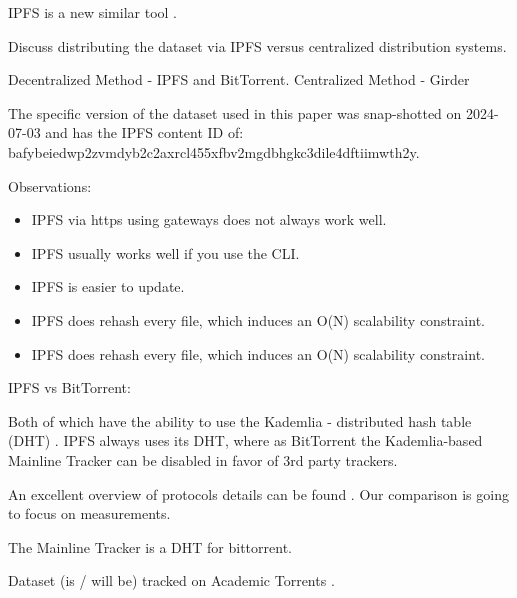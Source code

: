 \documentclass[10pt,twocolumn,letterpaper]{article}
\begin{document}
IPFS is a new similar tool \cite{benet_ipfs_2014,bieri_overview_2021}.


Discuss distributing the dataset via IPFS versus centralized distribution
systems.

Decentralized Method - IPFS and BitTorrent.
Centralized Method - Girder


The specific version of the dataset used in this paper was snap-shotted on
2024-07-03 and has the IPFS content ID of:
bafybeiedwp2zvmdyb2c2axrcl455xfbv2mgdbhgkc3dile4dftiimwth2y.

Observations:
\begin{itemize}
    \item IPFS via https using gateways does not always work well.
    \item IPFS usually works well if you use the CLI.
    \item IPFS is easier to update.
    \item IPFS does rehash every file, which induces an O(N) scalability constraint.
    \item IPFS does rehash every file, which induces an O(N) scalability constraint.
\end{itemize}


IPFS vs BitTorrent:

Both of which have the ability to use the Kademlia - distributed hash table (DHT) \cite{maymounkov_kademlia_2002}.
IPFS always uses its DHT, where as BitTorrent the Kademlia-based Mainline
Tracker can be disabled in favor of 3rd party trackers.

An excellent overview of protocols details can be found \cite{zebedee_comparing_2023}.
Our comparison is going to focus on measurements.



The Mainline Tracker is a DHT for bittorrent.



Dataset (is / will be) tracked on Academic Torrents \cite{academic_torrents_Cohen2014}.
\end{document}

